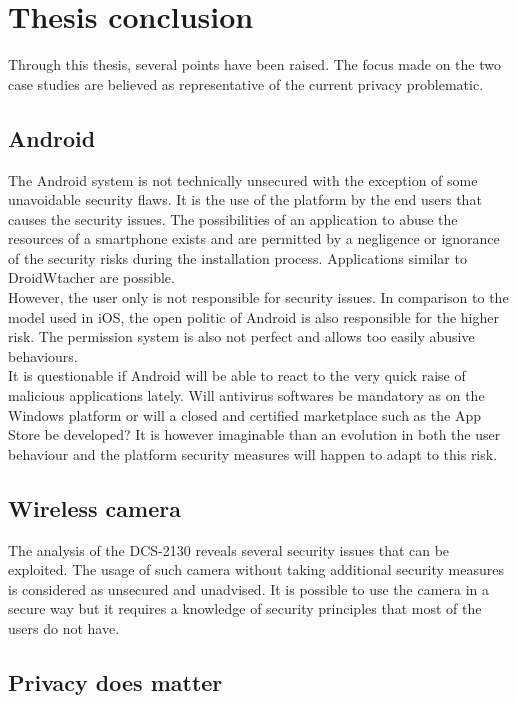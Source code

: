 \chapter{Thesis conclusion}

Through this thesis, several points have been raised.
The focus made on the two case studies are believed as representative of the current privacy problematic.

\section{Android}

The Android system is not technically unsecured with the exception of some unavoidable security flaws.
It is the use of the platform by the end users that causes the security issues.
The possibilities of an application to abuse the resources of a smartphone exists and are permitted by a negligence or ignorance of the security risks during the installation process.
Applications similar to DroidWtacher are possible.\\

However, the user only is not responsible for security issues.
In comparison to the model used in iOS, the open politic of Android is also responsible for the higher risk.
The permission system is also not perfect and allows too easily abusive behaviours.\\

It is questionable if Android will be able to react to the very quick raise of malicious applications lately.
Will antivirus softwares be mandatory as on the Windows platform or will a closed and certified marketplace such as the App Store be developed?
It is however imaginable than an evolution in both the user behaviour and the platform security measures will happen to adapt to this risk.

\section{Wireless camera}

The analysis of the DCS-2130 reveals several security issues that can be exploited.
The usage of such camera without taking additional security measures is  considered as unsecured and unadvised.
It is possible to use the camera in a secure way but it requires a knowledge of security principles that most of the users do not have.

\section{Privacy does matter}

